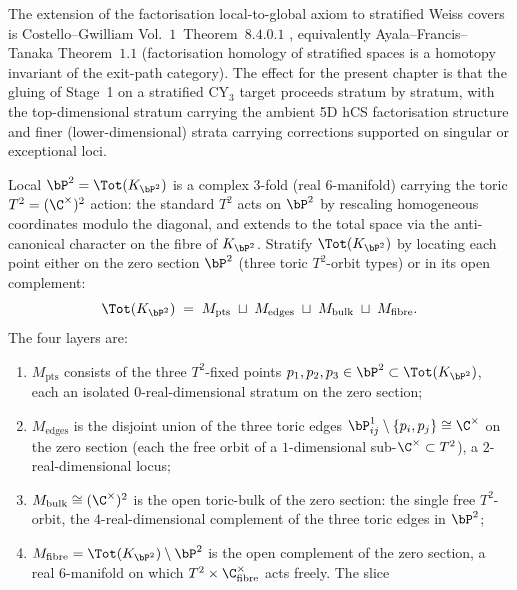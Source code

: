 The extension of the factorisation local-to-global axiom to stratified
Weiss covers is Costello--Gwilliam Vol.~$1$~Theorem~$8.4.0.1$
\cite{CostelloGwilliam}, equivalently Ayala--Francis--Tanaka
\cite{AyalaFrancisTanaka2017Strat} Theorem~$1.1$ (factorisation
homology of stratified spaces is a homotopy invariant of the exit-path
category).
The effect for the present chapter is that the gluing of Stage~1 on a
stratified CY$_3$ target proceeds stratum by stratum, with the
top-dimensional stratum carrying the ambient 5D hCS factorisation
structure and finer (lower-dimensional) strata carrying corrections
supported on singular or exceptional loci.

\begin{example}
\label{ex:local-p2-stratified-weiss}
Local $\bP^2 = \Tot(K_{\bP^2})$ is a complex $3$-fold (real $6$-manifold)
carrying the toric $T^2 = (\C^\times)^2$ action: the standard $T^2$
acts on $\bP^2$ by rescaling homogeneous coordinates modulo the
diagonal, and extends to the total space via the anti-canonical
character on the fibre of $K_{\bP^2}$. Stratify $\Tot(K_{\bP^2})$ by
locating each point either on the zero section $\bP^2$ (three toric
$T^2$-orbit types) or in its open complement:
\begin{equation}
\label{eq:local-p2-toric-strata}
 \Tot(K_{\bP^2}) \;=\;
 M_{\mathrm{pts}} \;\sqcup\; M_{\mathrm{edges}}
 \;\sqcup\; M_{\mathrm{bulk}} \;\sqcup\; M_{\mathrm{fibre}}.
\end{equation}
The four layers are:
\begin{enumerate}
\item[(i)] $M_{\mathrm{pts}}$ consists of the three $T^2$-fixed points
$p_1, p_2, p_3 \in \bP^2 \subset \Tot(K_{\bP^2})$, each an isolated
$0$-real-dimensional stratum on the zero section;
\item[(ii)] $M_{\mathrm{edges}}$ is the disjoint union of the three
toric edges $\bP^1_{ij} \setminus \{p_i, p_j\} \cong \C^\times$ on the
zero section (each the free orbit of a $1$-dimensional sub-$\C^\times
\subset T^2$), a $2$-real-dimensional locus;
\item[(iii)] $M_{\mathrm{bulk}} \cong (\C^\times)^2$ is the open
toric-bulk of the zero section: the single free $T^2$-orbit, the
$4$-real-dimensional complement of the three toric edges in
$\bP^2$;
\item[(iv)] $M_{\mathrm{fibre}} = \Tot(K_{\bP^2}) \setminus \bP^2$ is
the open complement of the zero section, a real $6$-manifold on which
$T^2 \times \C^\times_{\mathrm{fibre}}$ acts freely. The slice

\end{enumerate}
\end{example}
